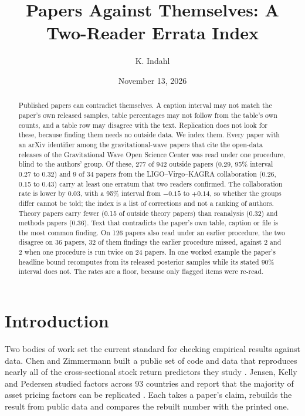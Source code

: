 \documentclass[reprint,amsmath,amssymb,aps,superscriptaddress,nofootinbib]{revtex4-2}
\begin{document}
\title{Papers Against Themselves: A Two-Reader Errata Index}

\author{K. Indahl}

\date{November 13, 2026}

\begin{abstract}
Published papers can contradict themselves. A caption interval may not match the paper's own released samples, table percentages may not follow from the table's own counts, and a table row may disagree with the text. Replication does not look for these, because finding them needs no outside data. We index them. Every paper with an arXiv identifier among the gravitational-wave papers that cite the open-data releases of the Gravitational Wave Open Science Center was read under one procedure, blind to the authors' group. Of these, 277 of 942 outside papers (0.29, 95\% interval 0.27 to 0.32) and 9 of 34 papers from the LIGO--Virgo--KAGRA collaboration (0.26, 0.15 to 0.43) carry at least one erratum that two readers confirmed. The collaboration rate is lower by 0.03, with a 95\% interval from $-0.15$ to $+0.14$, so whether the groups differ cannot be told; the index is a list of corrections and not a ranking of authors. Theory papers carry fewer (0.15 of outside theory papers) than reanalysis (0.32) and methods papers (0.36). Text that contradicts the paper's own table, caption or file is the most common finding. On 126 papers also read under an earlier procedure, the two disagree on 36 papers, 32 of them findings the earlier procedure missed, against 2 and 2 when one procedure is run twice on 24 papers. In one worked example the paper's headline bound recomputes from its released posterior samples while its stated 90\% interval does not. The rates are a floor, because only flagged items were re-read.
\end{abstract}

\maketitle

\section{Introduction}

Two bodies of work set the current standard for checking empirical results against data. Chen and Zimmermann built a public set of code and data that reproduces nearly all of the cross-sectional stock return predictors they study \cite{ChenZimmermann2022}. Jensen, Kelly and Pedersen studied factors across 93 countries and report that the majority of asset pricing factors can be replicated \cite{JKP2023}. Each takes a paper's claim, rebuilds the result from public data and compares the rebuilt number with the printed one.
\end{document}

